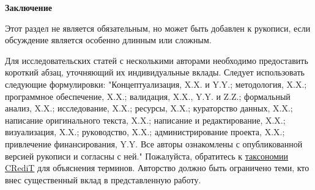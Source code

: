 \documentclass[i-edu.uz,journal,article,submit,pdftex,moreauthors]{Definitions/i-edu.uz}
\begin{document}
\begin{sloppypar}
{%

\noindent\textbf{Заключение}

Этот раздел не является обязательным, но может быть добавлен к рукописи, если обсуждение является особенно длинным или сложным.

\vspace{6pt} 




\authorcontributionsr

Для исследовательских статей с несколькими авторами необходимо предоставить короткий абзац, уточняющий их индивидуальные вклады. Следует использовать следующие формулировки: "Концептуализация, X.X. и Y.Y.; методология, X.X.; программное обеспечение, X.X.; валидация, X.X., Y.Y. и Z.Z.; формальный анализ, X.X.; исследование, X.X.; ресурсы, X.X.; кураторство данных, X.X.; написание оригинального текста, X.X.; написание и редактирование, X.X.; визуализация, X.X.; руководство, X.X.; администрирование проекта, X.X.; привлечение финансирования, Y.Y. Все авторы ознакомлены с опубликованной версией рукописи и согласны с ней." Пожалуйста, обратитесь к \href{http://img.mdpi.org/data/contributor-role-instruction.pdf}{таксономии CRediT} для объяснения терминов. Авторство должно быть ограничено теми, кто внес существенный вклад в представленную работу.

}
\end{sloppypar}
\end{document}
